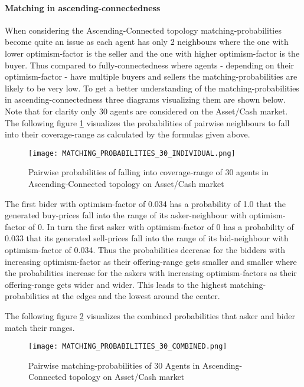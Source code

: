 \documentclass[Bachelorarbeit.tex]{subfiles}
\begin{document}
\paragraph{Matching in ascending-connectedness}
When considering the Ascending-Connected topology matching-probabilities become quite an issue as each agent has only 2 neighbours where the one with lower optimism-factor is the seller and the one with higher optimism-factor is the buyer. Thus compared to fully-connectedness where agents - depending on their optimism-factor - have multiple buyers and sellers the matching-probabilities are likely to be very low. To get a better understanding of the matching-probabilities in ascending-connectedness three diagrams visualizing them are shown below. Note that for clarity only 30 agents are considered on the Asset/Cash market.
\medskip
The following figure \ref{fig:MATCHING_PROBABILITIES_30_INDIVIDUAL} visualizes the probabilities of pairwise neighbours to fall into their coverage-range as calculated by the formulas given above.

\begin{figure}[H]
	\centering
  \texttt{[image: MATCHING\_PROBABILITIES\_30\_INDIVIDUAL.png]}
	\caption{Pairwise probabilities of falling into coverage-range of 30 agents in Ascending-Connected topology on Asset/Cash market}
	\label{fig:MATCHING_PROBABILITIES_30_INDIVIDUAL}
\end{figure}

The first bider with optimism-factor of 0.034 has a probability of 1.0 that the generated buy-prices fall into the range of its asker-neighbour with optimism-factor of 0. In turn the first asker with optimism-factor of 0 has a probability of 0.033 that its generated sell-prices fall into the range of its bid-neighbour with optimism-factor of 0.034. Thus the probabilities decrease for the bidders with increasing optimism-factor as their offering-range gets smaller and smaller where the probabilities increase for the askers with increasing optimism-factors as their offering-range gets wider and wider. This leads to the highest matching-probabilities at the edges and the lowest around the center.

The following figure \ref{fig:MATCHING_PROBABILITIES_30_COMBINED} visualizes the combined probabilities that asker and bider match their ranges.

\begin{figure}[H]
	\centering
  \texttt{[image: MATCHING\_PROBABILITIES\_30\_COMBINED.png]}
	\caption{Pairwise matching-probabilities of 30 Agents in Ascending-Connected topology on Asset/Cash market}
	\label{fig:MATCHING_PROBABILITIES_30_COMBINED}
\end{figure}
\end{document}
